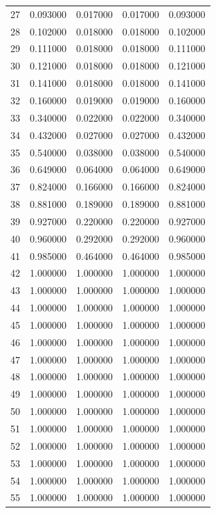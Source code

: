 \begin{tabular}{lrrrr}
27 & 0.093000 & 0.017000 & 0.017000 & 0.093000 \\
28 & 0.102000 & 0.018000 & 0.018000 & 0.102000 \\
29 & 0.111000 & 0.018000 & 0.018000 & 0.111000 \\
30 & 0.121000 & 0.018000 & 0.018000 & 0.121000 \\
31 & 0.141000 & 0.018000 & 0.018000 & 0.141000 \\
32 & 0.160000 & 0.019000 & 0.019000 & 0.160000 \\
33 & 0.340000 & 0.022000 & 0.022000 & 0.340000 \\
34 & 0.432000 & 0.027000 & 0.027000 & 0.432000 \\
35 & 0.540000 & 0.038000 & 0.038000 & 0.540000 \\
36 & 0.649000 & 0.064000 & 0.064000 & 0.649000 \\
37 & 0.824000 & 0.166000 & 0.166000 & 0.824000 \\
38 & 0.881000 & 0.189000 & 0.189000 & 0.881000 \\
39 & 0.927000 & 0.220000 & 0.220000 & 0.927000 \\
40 & 0.960000 & 0.292000 & 0.292000 & 0.960000 \\
41 & 0.985000 & 0.464000 & 0.464000 & 0.985000 \\
42 & 1.000000 & 1.000000 & 1.000000 & 1.000000 \\
43 & 1.000000 & 1.000000 & 1.000000 & 1.000000 \\
44 & 1.000000 & 1.000000 & 1.000000 & 1.000000 \\
45 & 1.000000 & 1.000000 & 1.000000 & 1.000000 \\
46 & 1.000000 & 1.000000 & 1.000000 & 1.000000 \\
47 & 1.000000 & 1.000000 & 1.000000 & 1.000000 \\
48 & 1.000000 & 1.000000 & 1.000000 & 1.000000 \\
49 & 1.000000 & 1.000000 & 1.000000 & 1.000000 \\
50 & 1.000000 & 1.000000 & 1.000000 & 1.000000 \\
51 & 1.000000 & 1.000000 & 1.000000 & 1.000000 \\
52 & 1.000000 & 1.000000 & 1.000000 & 1.000000 \\
53 & 1.000000 & 1.000000 & 1.000000 & 1.000000 \\
54 & 1.000000 & 1.000000 & 1.000000 & 1.000000 \\
55 & 1.000000 & 1.000000 & 1.000000 & 1.000000 \\

\end{tabular}
